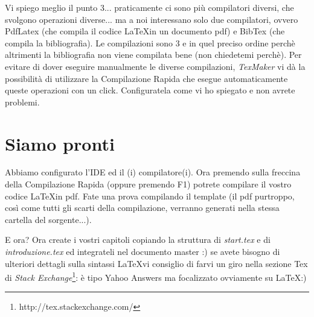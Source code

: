 Vi spiego meglio il punto 3... praticamente ci sono più compilatori diversi, che svolgono operazioni diverse... ma a noi interessano solo due compilatori, ovvero PdfLatex (che compila il codice \LaTeX in un documento pdf) e BibTex (che compila la bibliografia). Le compilazioni sono 3 e in quel preciso ordine perchè altrimenti la bibliografia non viene compilata bene (non chiedetemi perchè). Per evitare di dover eseguire manualmente le diverse compilazioni, \emph{TexMaker} vi dà la possibilità di utilizzare la Compilazione Rapida che esegue automaticamente queste operazioni con un click. Configuratela come vi ho spiegato e non avrete problemi.


\section{Siamo pronti}
\label{sec:pronti}

Abbiamo configurato l'IDE ed il (i) compilatore(i). Ora premendo sulla freccina della Compilazione Rapida (oppure premendo F1) potrete compilare il vostro codice \LaTeX in pdf. Fate una prova compilando il template (il pdf purtroppo, così come tutti gli scarti della compilazione, verranno generati nella stessa cartella del sorgente...).

E ora? Ora create i vostri capitoli copiando la struttura di \emph{start.tex} e di \emph{introduzione.tex} ed integrateli nel documento master :) se avete bisogno di ulteriori dettagli sulla sintassi \LaTeX vi consiglio di farvi un giro nella sezione Tex di \emph{Stack Exchange}\footnote{http://tex.stackexchange.com/}: è tipo Yahoo Answers ma focalizzato ovviamente su \LaTeX :)

\Blinddocument